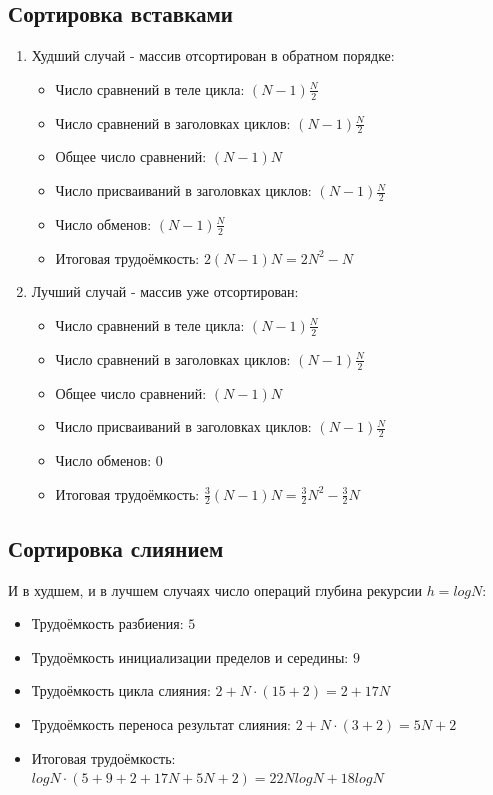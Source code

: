 \documentclass[12pt, a4paper]{report}
\begin{document}
	\subsection{Сортировка вставками}
	\begin{enumerate}
		\item Худший случай - массив отсортирован в обратном порядке:
		\begin{itemize}
			\item Число сравнений в теле цикла: $(N-1)\frac{N}{2}$
			\item Число сравнений в заголовках циклов: $(N-1)\frac{N}{2}$
			\item Общее число сравнений: $(N-1)N$
			\item Число присваиваний в заголовках циклов: $(N-1)\frac{N}{2}$
			\item Число обменов: $(N-1)\frac{N}{2}$\\
			\item Итоговая трудоёмкость: $2(N-1)N = 2N^2 - N$
		\end{itemize}
		\item Лучший случай - массив уже отсортирован:
		\begin{itemize}
			\item Число сравнений в теле цикла: $(N-1)\frac{N}{2}$
			\item Число сравнений в заголовках циклов: $(N-1)\frac{N}{2}$
			\item Общее число сравнений: $(N-1)N$
			\item Число присваиваний в заголовках циклов: $(N-1)\frac{N}{2}$
			\item Число обменов: $0$\\
			\item Итоговая трудоёмкость: $\frac{3}{2}(N-1)N = \frac{3}{2}N^2 - \frac{3}{2}N$
		\end{itemize}
	\end{enumerate}
	
	\subsection{Сортировка слиянием}
	И в худшем, и в лучшем случаях число операций глубина рекурсии $h = logN$:
	\begin{itemize}
		\item Трудоёмкость разбиения: $5$
		\item Трудоёмкость инициализации пределов и середины: $9$
		\item Трудоёмкость цикла слияния: $2 + N\cdot(15 + 2) = 2 + 17N$
		\item Трудоёмкость переноса результат слияния: $2 + N\cdot(3 + 2) = 5N + 2$\
		\item Итоговая трудоёмкость: $logN\cdot(5 + 9 + 2 + 17N + 5N + 2) = 22NlogN + 18logN$
	\end{itemize}
	
\end{document}
